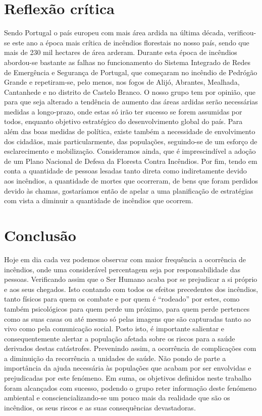 \documentclass{report}
\begin{document}
\chapter{Reflexão crítica}
Sendo Portugal o país europeu com mais área ardida na última década, verificou-se este ano a época mais crítica de incêndios florestais no nosso país, sendo que mais de 230 mil hectares de área arderam.
Durante esta época de incêndios abordou-se bastante as falhas no funcionamento do Sistema Integrado de Redes de Emergência e Segurança de Portugal, que começaram no incêndio de Pedrógão Grande e repetiram-se, pelo menos, nos fogos de Alijó, Abrantes, Mealhada, Cantanhede e no distrito de Castelo Branco.
O nosso grupo tem por opinião, que para que seja alterado a tendência de aumento das áreas ardidas serão necessárias medidas a longo-prazo, onde estas só irão ter sucesso se forem assumidas por todos, enquanto objetivo estratégico do desenvolvimento global do país.
Para além das boas medidas de política, existe também a necessidade de envolvimento dos cidadãos, mais particularmente, das populações, seguindo-se de um esforço de esclarecimento e mobilização.
Consideramos ainda, que é imprescindível a adoção de um Plano Nacional de Defesa da Floresta Contra Incêndios.
Por fim, tendo em conta a quantidade de pessoas lesadas tanto direta como indiretamente devido aos incêndios, a quantidade de mortes que ocorreram, de bens que foram perdidos devido às chamas, gostaríamos então de apelar a uma planificação de estratégias com vista a diminuir a quantidade de incêndios que ocorrem. 





\chapter{Conclusão}
Hoje em dia cada vez podemos observar com maior frequência a ocorrência de incêndios, onde uma considerável percentagem seja por responsabilidade das pessoas. Verificando assim que o Ser Humano acaba por se prejudicar a si próprio e aos seus chegados. Isto contando com todos os efeitos precedentes dos incêndios, tanto físicos para quem os combate e por quem é “rodeado” por estes, como também psicológicos para quem perde um próximo, para quem perde pertences como as suas casas ou até mesmo só pelas imagens que são capturadas tanto ao vivo como pela comunicação social.
Posto isto, é importante salientar e consequentemente alertar a população afetada sobre os riscos para a saúde derivados destas catástrofes. Prevenindo assim, a ocorrência de complicações com a diminuição da recorrência a unidades de saúde. Não pondo de parte a importância da ajuda necessária às populações que acabam por ser envolvidas e prejudicadas por este fenómeno.
Em suma, os objetivos definidos neste trabalho foram alcançados com sucesso, podendo o grupo reter informação deste fenómeno ambiental e consciencializando-se um pouco mais da realidade que são os incêndios, os seus riscos e as suas consequências devastadoras.
\end{document}
